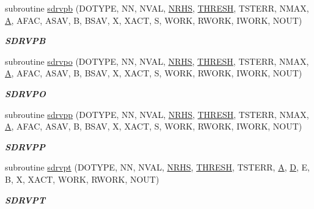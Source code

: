 \begin{DoxyCompactItemize}
subroutine \hyperlink{group__single__lin_gac05ab9e86a210390225b6f876f8c07d7}{sdrvpb} (D\+O\+T\+Y\+P\+E, N\+N, N\+V\+A\+L, \hyperlink{example__user_8c_aa0138da002ce2a90360df2f521eb3198}{N\+R\+H\+S}, \hyperlink{zlaqgs_8c_a0656018abfc9fa2821827415f5d5ea57}{T\+H\+R\+E\+S\+H}, T\+S\+T\+E\+R\+R, N\+M\+A\+X, \hyperlink{classA}{A}, A\+F\+A\+C, A\+S\+A\+V, B, B\+S\+A\+V, X, X\+A\+C\+T, S, W\+O\+R\+K, R\+W\+O\+R\+K, I\+W\+O\+R\+K, N\+O\+U\+T)
\begin{DoxyCompactList}\small\item\em {\bfseries S\+D\+R\+V\+P\+B} \end{DoxyCompactList}\item 
subroutine \hyperlink{group__single__lin_ga507a0c7f9896feb4fa6fc82a12ec888f}{sdrvpo} (D\+O\+T\+Y\+P\+E, N\+N, N\+V\+A\+L, \hyperlink{example__user_8c_aa0138da002ce2a90360df2f521eb3198}{N\+R\+H\+S}, \hyperlink{zlaqgs_8c_a0656018abfc9fa2821827415f5d5ea57}{T\+H\+R\+E\+S\+H}, T\+S\+T\+E\+R\+R, N\+M\+A\+X, \hyperlink{classA}{A}, A\+F\+A\+C, A\+S\+A\+V, B, B\+S\+A\+V, X, X\+A\+C\+T, S, W\+O\+R\+K, R\+W\+O\+R\+K, I\+W\+O\+R\+K, N\+O\+U\+T)
\begin{DoxyCompactList}\small\item\em {\bfseries S\+D\+R\+V\+P\+O} \end{DoxyCompactList}\item 
subroutine \hyperlink{group__single__lin_gad74f505717a46d348c8d8a773fd3e04d}{sdrvpp} (D\+O\+T\+Y\+P\+E, N\+N, N\+V\+A\+L, \hyperlink{example__user_8c_aa0138da002ce2a90360df2f521eb3198}{N\+R\+H\+S}, \hyperlink{zlaqgs_8c_a0656018abfc9fa2821827415f5d5ea57}{T\+H\+R\+E\+S\+H}, T\+S\+T\+E\+R\+R, N\+M\+A\+X, \hyperlink{classA}{A}, A\+F\+A\+C, A\+S\+A\+V, B, B\+S\+A\+V, X, X\+A\+C\+T, S, W\+O\+R\+K, R\+W\+O\+R\+K, I\+W\+O\+R\+K, N\+O\+U\+T)
\begin{DoxyCompactList}\small\item\em {\bfseries S\+D\+R\+V\+P\+P} \end{DoxyCompactList}\item 
subroutine \hyperlink{group__single__lin_gaf32fb50dec6bb992f4d0c3ef5be1afcd}{sdrvpt} (D\+O\+T\+Y\+P\+E, N\+N, N\+V\+A\+L, \hyperlink{example__user_8c_aa0138da002ce2a90360df2f521eb3198}{N\+R\+H\+S}, \hyperlink{zlaqgs_8c_a0656018abfc9fa2821827415f5d5ea57}{T\+H\+R\+E\+S\+H}, T\+S\+T\+E\+R\+R, \hyperlink{classA}{A}, \hyperlink{odrpack_8h_a7dae6ea403d00f3687f24a874e67d139}{D}, E, B, X, X\+A\+C\+T, W\+O\+R\+K, R\+W\+O\+R\+K, N\+O\+U\+T)
\begin{DoxyCompactList}\small\item\em {\bfseries S\+D\+R\+V\+P\+T} \end{DoxyCompactList}\item 

\end{DoxyCompactItemize}
